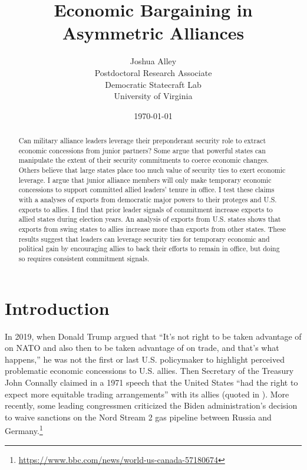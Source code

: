 \documentclass[12pt]{article}
\title{\textbf{Economic Bargaining in Asymmetric Alliances}}
\author{
Joshua Alley\\
Postdoctoral Research Associate\\
Democratic Statecraft Lab\\
University of Virginia 
}
\date{\today}
\begin{document}
\maketitle 

\begin{abstract}
Can military alliance leaders leverage their preponderant security role to extract economic concessions from junior partners?
Some argue that powerful states can manipulate the extent of their security commitments to coerce economic changes. 
Others believe that large states place too much value of security ties to exert economic leverage.  
I argue that junior alliance members will only make temporary economic concessions to support committed allied leaders' tenure in office. 
I test these claims with a analyses of exports from democratic major powers to their proteges and U.S. exports to allies. 
I find that prior leader signals of commitment increase exports to allied states during election years. 
An analysis of exports from U.S. states shows that exports from swing states to allies increase more than exports from other states. 
These results suggest that leaders can leverage security ties for temporary economic and political gain by encouraging allies to back their efforts to remain in office, but doing so requires consistent commitment signals. 
\end{abstract} 


\newpage 
\doublespace 


\section{Introduction}

In 2019, when Donald Trump argued that ``It's not right to be taken advantage of on NATO and also then to be taken advantage of on trade, and that's what happens,'' he was not the first or last U.S. policymaker to highlight perceived problematic economic concessions to U.S. allies.
Then Secretary of the Treasury John Connally claimed in a 1971 speech that the United States ``had the right to expect more equitable trading arrangements'' with its allies (quoted in \citep[pg 175]{Sayle2019}).
More recently, some leading congressmen criticized the Biden administration's decision to waive sanctions on the Nord Stream 2 gas pipeline between Russia and Germany.\footnote{\url{https://www.bbc.com/news/world-us-canada-57180674}}
\end{document}
